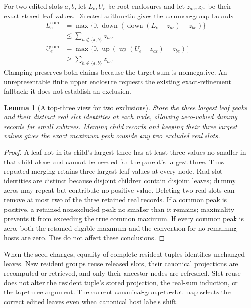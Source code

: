 \documentclass[11pt]{article}
\newtheorem{lemma}{Lemma}
\begin{document}
For two edited slots $a,b$, let $L_e,U_e$ be root enclosures and let $z_{ae},z_{be}$ be their exact stored leaf values. Directed arithmetic gives the common-group bounds
\begin{align}
L_e^{\mathrm{com}}&=\max\{0,\operatorname{down}(\operatorname{down}(L_e-z_{ae})-z_{be})\}\\
&\le\sum_{h\notin\{a,b\}}z_{he},\\
U_e^{\mathrm{com}}&=\max\{0,\operatorname{up}(\operatorname{up}(U_e-z_{ae})-z_{be})\}\\
&\ge\sum_{h\notin\{a,b\}}z_{he}.
\end{align}
Clamping preserves both claims because the target sum is nonnegative. An unrepresentable finite upper enclosure requests the existing exact-refinement fallback; it does not establish an exclusion.

\begin{lemma}[A top-three view for two exclusions]\label{lem:top-three-common}
Store the three largest leaf peaks and their distinct real slot identities at each node, allowing zero-valued dummy records for small subtrees. Merging child records and keeping their three largest values gives the exact maximum peak outside any two excluded real slots.
\end{lemma}
\begin{proof}
A leaf not in its child's largest three has at least three values no smaller in that child alone and cannot be needed for the parent's largest three. Thus repeated merging retains three largest leaf values at every node. Real slot identities are distinct because disjoint children contain disjoint leaves; dummy zeros may repeat but contribute no positive value. Deleting two real slots can remove at most two of the three retained real records. If a common peak is positive, a retained nonexcluded peak no smaller than it remains; maximality prevents it from exceeding the true common maximum. If every common peak is zero, both the retained eligible maximum and the convention for no remaining hosts are zero. Ties do not affect these conclusions.
\end{proof}

When the seed changes, equality of complete resident tuples identifies unchanged leaves. New resident groups reuse released slots, their canonical projections are recomputed or retrieved, and only their ancestor nodes are refreshed. Slot reuse does not alter the resident tuple's stored projection, the real-sum induction, or the top-three argument. The current canonical-group-to-slot map selects the correct edited leaves even when canonical host labels shift.
\end{document}
